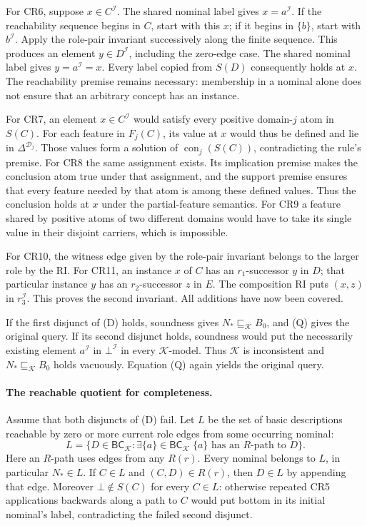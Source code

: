 For CR6, suppose \(x\in C^{\mathcal I}\).  The shared nominal label
gives \(x=a^{\mathcal I}\).
If the reachability sequence begins in \(C\), start with this \(x\);
if it begins in \(\{b\}\), start with \(b^{\mathcal I}\).
Apply the role-pair invariant successively along the finite sequence.
This produces an element \(y\in D^{\mathcal I}\), including the
zero-edge case.  The shared nominal label gives
\(y=a^{\mathcal I}=x\).  Every label copied from \(S(D)\) consequently
holds at \(x\).  The reachability premise remains necessary: membership
in a nominal alone does not ensure that an arbitrary concept has an instance.

For CR7, an element \(x\in C^{\mathcal I}\) would satisfy every positive
domain-\(j\) atom in \(S(C)\).  For each feature in \(F_j(C)\), its value
at \(x\) would thus be defined and lie in \(\Delta^{\mathcal D_j}\).
Those values form a solution of
\(\operatorname{con}_j(S(C))\), contradicting the rule's premise.
For CR8 the same assignment exists.  Its implication premise makes the
conclusion atom true under that assignment, and the support premise ensures
that every feature needed by that atom is among these defined values.
Thus the conclusion holds at \(x\) under the partial-feature semantics.
For CR9 a feature shared by positive atoms of two different domains would
have to take its single value in their disjoint carriers, which is impossible.

For CR10, the witness edge given by the role-pair invariant belongs to
the larger role by the RI.  For CR11, an instance \(x\) of \(C\) has an
\(r_1\)-successor \(y\) in \(D\); that particular instance \(y\) has an
\(r_2\)-successor \(z\) in \(E\).  The composition RI puts
\((x,z)\) in \(r_3^{\mathcal I}\).  This proves the second invariant.
All additions have now been covered.

If the first disjunct of (D) holds, soundness gives
\(N_\ast\sqsubseteq_{\mathcal K}B_0\), and (Q) gives the original query.
If its second disjunct holds, soundness would put the necessarily existing
element \(a^{\mathcal I}\) in \(\bot^{\mathcal I}\) in every
\(\mathcal K\)-model.  Thus \(\mathcal K\) is inconsistent and
\(N_\ast\sqsubseteq_{\mathcal K}B_0\) holds vacuously.  Equation (Q)
again yields the original query.

\paragraph{The reachable quotient for completeness.}
Assume that both disjuncts of (D) fail.
Let \(L\) be the set of basic descriptions reachable by zero or more
current role edges from some occurring nominal:
\[
 L=\{D\in\mathsf{BC}_{\mathcal K}:
       \exists\{a\}\in\mathsf{BC}_{\mathcal K}\;
       \{a\}\text{ has an }R\text{-path to }D\}.
\]
Here an \(R\)-path uses edges from any \(R(r)\).
Every nominal belongs to \(L\), in particular \(N_\ast\in L\).
If \(C\in L\) and \((C,D)\in R(r)\), then \(D\in L\) by appending
that edge.  Moreover \(\bot\notin S(C)\) for every \(C\in L\):
otherwise repeated CR5 applications backwards along a path to \(C\)
would put bottom in its initial nominal's label, contradicting the failed
second disjunct.

